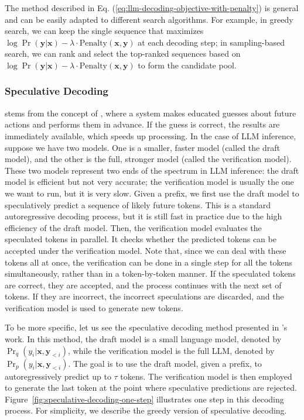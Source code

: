 The method described in Eq. (\ref{eq:llm-decoding-objective-with-penalty}) is general and can be easily adapted to different search algorithms. For example, in greedy search, we can keep the single sequence that maximizes $\log \Pr(\mathbf{y}|\mathbf{x}) - \lambda \cdot \mathrm{Penalty}(\mathbf{x},\mathbf{y})$ at each decoding step; in sampling-based search, we can rank and select the top-ranked sequences based on $\log \Pr(\mathbf{y}|\mathbf{x}) - \lambda \cdot \mathrm{Penalty}(\mathbf{x},\mathbf{y})$ to form the candidate pool.

\subsubsection{Speculative Decoding}

 stems from the concept of , where a system makes educated guesses about future actions and performs them in advance. If the guess is correct, the results are immediately available, which speeds up processing. In the case of LLM inference, suppose we have two models. One is a smaller, faster model (called the draft model), and the other is the full, stronger model (called the verification model). These two models represent two ends of the spectrum in LLM inference: the draft model is efficient but not very accurate; the verification model is usually the one we want to run, but it is very slow. Given a prefix, we first use the draft model to speculatively predict a sequence of likely future tokens. This is a standard autoregressive decoding process, but it is still fast in practice due to the high efficiency of the draft model. Then, the verification model evaluates the speculated tokens in parallel. It checks whether the predicted tokens can be accepted under the verification model. Note that, since we can deal with these tokens all at once, the verification can be done in a single step for all the tokens simultaneously, rather than in a token-by-token manner. If the speculated tokens are correct, they are accepted, and the process continues with the next set of tokens. If they are incorrect, the incorrect speculations are discarded, and the verification model is used to generate new tokens.

To be more specific, let us see the speculative decoding method presented in \citet{leviathan-etal:2023fast}'s work. In this method, the draft model is a small language model, denoted by $\Pr_q(y_i|\mathbf{x},\mathbf{y}_{<i})$, while the verification model is the full LLM, denoted by $\Pr_p(y_i|\mathbf{x},\mathbf{y}_{<i})$. The goal is to use the draft model, given a prefix, to autoregressively predict up to $\tau$ tokens. The verification model is then employed to generate the last token at the point where speculative predictions are rejected. Figure~\ref{fig:speculative-decoding-one-step} illustrates one step in this decoding process. For simplicity, we describe the greedy version of speculative decoding.

